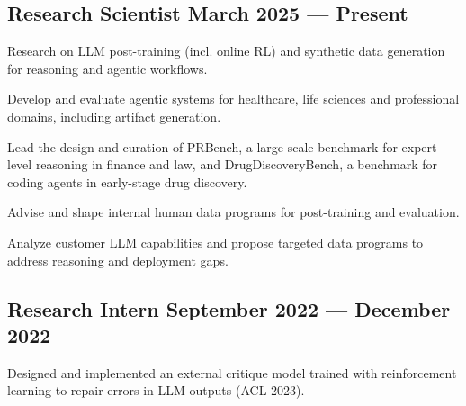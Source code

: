 \subsection{{Research Scientist \hfill March 2025 --- Present}}
\begin{zitemize}
\item Research on LLM post-training (incl. online RL) and synthetic data generation for reasoning and agentic workflows.
\item Develop and evaluate agentic systems for healthcare, life sciences and professional domains, including artifact generation.
\item Lead the design and curation of PRBench, a large-scale benchmark for expert-level reasoning in finance and law, and DrugDiscoveryBench, a benchmark for coding agents in early-stage drug discovery.
\item Advise and shape internal human data programs for post-training and evaluation.
\item Analyze customer LLM capabilities and propose targeted data programs to address reasoning and deployment gaps.
\end{zitemize}

\subsection{{Research Intern \hfill September 2022 --- December 2022}}
\begin{zitemize}
\item Designed and implemented an external critique model trained with reinforcement learning to repair errors in LLM outputs (ACL 2023).
\end{zitemize}

